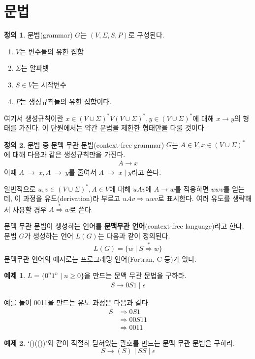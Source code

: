 \documentclass[b5paper]{book}
\theoremstyle{definition}
\newtheorem{defn}{정의}[chapter]
\newtheorem{ex}{예제}[chapter]
\begin{document}
\section{문법}
\begin{defn}
    문법(grammar) $G$는 $(V, \Sigma, S, P)$로 구성된다.
\end{defn} 
\begin{enumerate}
    \item $V$는 변수들의 유한 집합
    \item $\Sigma$는 알파벳
    \item $S \in V$는 시작변수
    \item $P$는 생성규칙들의 유한 집합이다. 
\end{enumerate}
여기서 생성규칙이란 $x\in (V \cup \Sigma)^* V 
(V \cup \Sigma )^*, y \in (V \cup \Sigma)^*$에 대해 $x \rightarrow y$의 형태를 가진다.
이 단원에서는 약간 문법을 제한한 형태만을 다룰 것이다. 
\begin{defn}
    문법 중 문맥 무관 문법(context-free grammar) $G$는 $A \in V, x \in (V \cup \Sigma)^*$ 에 대해
다음과 같은 생성규칙만을 가진다.
\begin{align*}
    A \rightarrow x
\end{align*}
이때 $A \; \rightarrow \; x, A\; \rightarrow \; y$를 줄여서 $A \; \rightarrow \; x \; \vert \; y $라고 쓴다.
\end{defn} 
일반적으로 $u, v \in (V \cup \Sigma)^*, A \in V$에 대해 $uAv$에 $A \rightarrow w$를
적용하면 $uwv$를 얻는데, 이 과정을 유도(derivation)라 부르고 $uAv \Rightarrow uwv$로 표시한다. 
여러 유도를 생략해서 사용할 경우 $A \overset{*}{\Rightarrow} w$로 쓴다. 

문맥 무관 문법이 생성하는 언어를 \textbf{문맥무관 언어}(context-free language)라고 한다. 
문법 $G$가 생성하는 언어 $L(G)$는 다음과 같이 정의된다.
\begin{align*}
    L(G) = \{ w \; \vert \; S \overset{*}{\Rightarrow} w \}
\end{align*}
문맥무관 언어의 예시로는 프로그래밍 언어(Fortran, C 등)가 있다. 
\begin{ex} \label{0n1n_CFG}
$L = \{ 0^n 1^n \; \vert \; n \ge 0\}$을 만드는 문맥 무관 문법을 구하라.
\begin{align*}
    S \rightarrow 0S1 \; \vert \; \epsilon 
\end{align*}
\end{ex}
예를 들어 0011을 만드는 유도 과정은 다음과 같다.
\begin{align*}
    S &\Rightarrow 0S1 \\
    &\Rightarrow 00S11 \\ 
    &\Rightarrow 0011
\end{align*}
\begin{ex} \label{bracket_CFG}
     `()(())'와 같이 적절히 닫혀있는 괄호를 만드는 문맥 무관 문법을 구하라.
    $$ S \rightarrow (S) \; \vert \; SS \; \vert \; \epsilon $$
\end{ex} 
\end{document}

